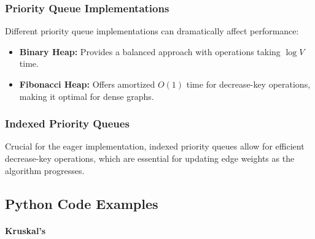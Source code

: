 \documentclass{article}
\begin{document}
\subsubsection{Priority Queue Implementations}
Different priority queue implementations can dramatically affect performance:
\begin{itemize}
  \item \textbf{Binary Heap:} Provides a balanced approach with operations taking $\log V$ time.
  \item \textbf{Fibonacci Heap:} Offers amortized $O(1)$ time for decrease-key operations, making it optimal for dense graphs.
\end{itemize}

\subsubsection{Indexed Priority Queues}
Crucial for the eager implementation, indexed priority queues allow for efficient decrease-key operations, which are essential for updating edge weights as the algorithm progresses.

\subsection{Python Code Examples}

\paragraph{Kruskal's}
\end{document}
